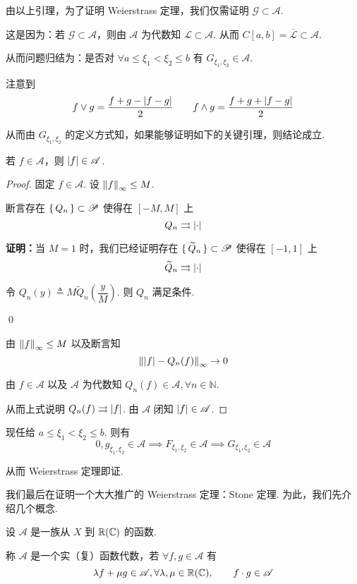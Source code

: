 由以上引理，为了证明 Weierstrass 定理，我们仅需证明 $\mathscr{G}\subset\mathscr{A}$.

这是因为：若 $\mathscr{G}\subset\mathscr{A}$，则由 $\mathscr{A}$ 为代数知 $\mathscr{L}\subset\mathscr{A}$. 从而 $C[a,b]=\overline{\mathscr{L}}\subset\mathscr{A}$.

从而问题归结为：是否对 $\forall a\le\xi_1<\xi_2\le b$ 有 $G_{\xi_1,\xi_2}\in\mathscr{A}$.

注意到
$$
f\vee g=\frac{f+g-\left\lvert{f-g}\right\rvert}{2}\qquad f\wedge g=\frac{f+g+\left\lvert{f-g}\right\rvert}{2}
$$

从而由 $G_{\xi_1,\xi_2}$ 的定义方式知，如果能够证明如下的关键引理，则结论成立.

\begin{lemma}
    若 $f\in\mathscr{A}$，则 $\left\lvert{f}\right\rvert\in\mathscr{A}$.
\end{lemma}
\begin{proof}
    固定 $f\in\mathscr{A}$. 设 $\left\lVert{f}\right\rVert_\infty\le M$.

    断言存在 $\set{Q_n}\subset\mathscr{P}$ 使得在 $[-M,M]$ 上
$$
Q_n\rightrightarrows\left\lvert{\cdot}\right\rvert
$$

    \textbf{证明：}当 $M=1$ 时，我们已经证明存在 $\set{\widetilde{Q}_n}\subset\mathscr{P}$ 使得在 $[-1,1]$ 上
$$
\widetilde{Q}_n\rightrightarrows\left\lvert{\cdot}\right\rvert
$$

    令 $Q_n(y)\triangleq M\widetilde{Q}_n\left(\dfrac{y}{M}\right)$. 则 $Q_n$ 满足条件.

    \qed

    由 $\left\lVert{f}\right\rVert_\infty\le M$ 以及断言知
$$
\left\lVert{\left\lvert{f}\right\rvert-Q_n(f)}\right\rVert_\infty\to 0
$$

    由 $f\in\mathscr{A}$ 以及 $\mathscr{A}$ 为代数知 $Q_n(f)\in\mathscr{A},\forall n\in\mathbb{N}$.

    从而上式说明 $Q_n(f)\rightrightarrows\left\lvert{f}\right\rvert$. 由 $\mathscr{A}$ 闭知 $\left\lvert{f}\right\rvert\in\mathscr{A}$.
\end{proof}

现任给 $a\le\xi_1<\xi_2\le b$. 则有
$$
0,g_{\xi_1,\xi_2}\in\mathscr{A}\implies F_{\xi_1,\xi_2}\in\mathscr{A}\implies G_{\xi_1,\xi_2}\in\mathscr{A}
$$

从而 Weierstrass 定理即证.


我们最后在证明一个大大推广的 Weierstrass 定理：Stone 定理. 为此，我们先介绍几个概念.

\begin{definition}
    设 $\mathscr{A}$ 是一族从 $X$ 到 $\mathbb{R}(\mathbb{C})$ 的函数.

    称 $\mathscr{A}$ 是一个实（复）函数代数，若 $\forall f,g\in\mathscr{A}$ 有
$$
\lambda f+\mu g\in\mathscr{A},\forall\lambda,\mu\in\mathbb{R}(\mathbb{C}),\qquad f\cdot g\in\mathscr{A}
$$
\end{definition}

